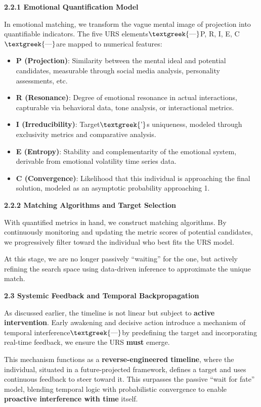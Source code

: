 \documentclass[a4paper]{article}
\begin{document}
\textbf{2.2.1 Emotional Quantification Model}

In emotional matching, we transform the vague mental image of projection into quantifiable indicators. The five URS
elements$\text{\textgreek{—}}$P, R, I, E, C$\text{\textgreek{—}}$are mapped to numerical features:

\begin{itemize}[series=listWWNumiv,label=[F0B7?]]
\item \textbf{P (Projection)}: Similarity between the mental ideal and potential candidates, measurable through social
media analysis, personality assessments, etc.
\item \textbf{R (Resonance)}: Degree of emotional resonance in actual interactions, capturable via behavioral data, tone
analysis, or interactional metrics.
\item \textbf{I (Irreducibility)}: Target$\text{\textgreek{’}}$s uniqueness, modeled through exclusivity metrics and
comparative analysis.
\item \textbf{E (Entropy)}: Stability and complementarity of the emotional system, derivable from emotional volatility
time series data.
\item \textbf{C (Convergence)}: Likelihood that this individual is approaching the final solution, modeled as an
asymptotic probability approaching 1.
\end{itemize}
\textbf{2.2.2 Matching Algorithms and Target Selection}

With quantified metrics in hand, we construct matching algorithms. By continuously monitoring and updating the metric
scores of potential candidates, we progressively filter toward the individual who best fits the URS model.

At this stage, we are no longer passively “waiting” for the one, but actively refining the search space using
data-driven inference to approximate the unique match.

\textbf{2.3 Systemic Feedback and Temporal Backpropagation}

As discussed earlier, the timeline is not linear but subject to \textbf{active intervention}. Early awakening and
decisive action introduce a mechanism of temporal interference$\text{\textgreek{—}}$by predefining the target and
incorporating real-time feedback, we ensure the URS \textbf{must} emerge.

This mechanism functions as a \textbf{reverse-engineered timeline}, where the individual, situated in a future-projected
framework, defines a target and uses continuous feedback to steer toward it. This surpasses the passive “wait for fate”
model, blending temporal logic with probabilistic convergence to enable \textbf{proactive interference with time}
itself.
\end{document}
